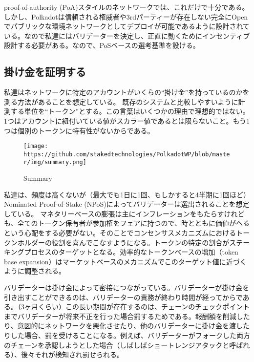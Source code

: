 proof-of-authority
(PoA)スタイルのネットワークでは、これだけで十分である。しかし、Polkadotは信頼される権威者や3rdパーティーが存在しない完全にOpenでパブリックな環境ネットワークとしてデプロイが可能であるように設計されている。なので私達にはバリデーターを決定し、正直に動くためにインセンティブ設計する必要がある。なので、PoSベースの選考基準を設ける。

\hypertarget{ux639bux3051ux91d1ux3092ux8a3cux660eux3059ux308b}{%
\subsection{掛け金を証明する}\label{ux639bux3051ux91d1ux3092ux8a3cux660eux3059ux308b}}

私達はネットワークに特定のアカウントがいくらの``掛け金''を持っているのかを測る方法があることを想定している。
既存のシステムと比較しやすいように計測する単位を``トークン''とする。この言葉はいくつかの理由で理想的ではない。1つはアカウントに紐付いている値がスカラー値であるとは限らないこと。もう1つは個別のトークンに特有性がないからである。

\begin{figure}
\centering
\texttt{[image: https://github.com/stakedtechnologies/PolkadotWP/blob/master/img/summary.png]}
\caption{Summary}
\end{figure}

私達は、頻度は高くないが（最大でも1日に1回、もしかすると4半期に1回ほど）Nominated
Proof-of-Stake
(NPoS)によってバリデーターは選出されることを想定している。
マネタリーベースの膨張は主にインフレーションをもたらすけれども、全てのトークン保有者が参加権をフェアに持つので、時とともに価値がへるという心配をする必要がない。そのことでコンセンサスメカニズムにおけるトークンホルダーの役割を喜んでこなすようになる。トークンの特定の割合がステーキングプロセスのターゲットとなる。効率的なトークンベースの増加（token
base
expansion）はマーケットベースのメカニズムでこのターゲット値に近づくように調整される。

バリデーターは掛け金によって密接につながっている。バリデーターが掛け金を引き出すことができるのは、バリデーターの責務が終わり時間が経ってからである。（3ヶ月くらい）この長い期間が存在するのは、チェーンのチェックポイントまでバリデーターが将来不正を行った場合罰するためである。報酬額を削減したり、意図的にネットワークを悪化させたり、他のバリデーターに掛け金を渡したりした場合、罰を受けることになる。例えば、バリデーターがフォークした両方のチェーンを承認しようとした場合（しばしばショートレンジアタックと呼ばれる）、後々それが検知され罰せられる。

